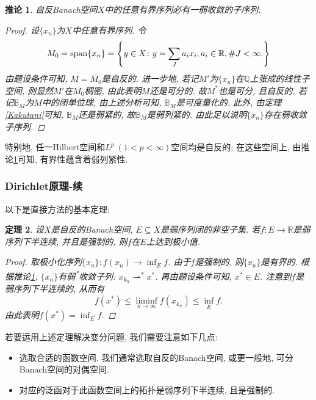 \documentclass[12pt,a4paper]{article}
\newtheorem{theorem}{定理}[section]
\newtheorem{corollary}[theorem]{推论}
\begin{document}
\begin{corollary}\label{coro2.9}
    自反Banach空间$X$中的任意有界序列必有一弱收敛的子序列.
    \begin{proof}
        设$\{x_n\}$为$X$中任意有界序列. 令
        \begin{equation*}
            M_0 = {\rm span} \{x_n\} = \left\{y \in X\colon y = \sum_Ja_ix_i, a_i \in \mathbb{R}, \# J < \infty.\right\}
        \end{equation*}
        由题设条件可知, $M = \overline{M_0}$是自反的. 进一步地, 若记$M'$为$\{x_n\}$在$\mathbb{Q}$上张成的线性子空间, 则显然$M'$在$M_0$稠密, 由此表明$M$还是可分的.
        故$M^*$也是可分, 且自反的. 若记$\mathbb{B}_M$为$M$中的闭单位球, 由上述分析可知, $\mathbb{B}_M$是可度量化的.
        此外, 由定理\ref{Kakutani}可知, $\mathbb{B}_M$还是弱紧的, 故$\mathbb{B}_M$是弱列紧的.
        由此足以说明$\{x_n\}$存在弱收敛子序列.
    \end{proof}
\end{corollary}

特别地, 任一Hilbert空间和$L^p \ (1 < p < \infty)$空间均是自反的; 在这些空间上, 由推论\ref{coro2.9}可知, 有界性蕴含着弱列紧性.

\subsubsection{Dirichlet原理-续}

以下是直接方法的基本定理: 

\begin{theorem}\label{th2.10}
    设$X$是自反的Banach空间, $E \subseteq X$是弱序列闭的非空子集.
    若$f \colon E \rightarrow \mathbb{R}$是弱序列下半连续, 并且是强制的, 则$f$在$E$上达到极小值.
    \begin{proof}
        取极小化序列$\{x_n\}\colon f(x_n) \rightarrow \inf_Ef$. 由于$f$是强制的, 则$\{x_n\}$是有界的.
        根据推论\ref{coro2.9}, $\{x_n\}$有弱\textsuperscript{*}收敛子列: $x_{k_n} \rightharpoonup^* x^*$. 再由题设条件可知, $x^* \in E$.
        注意到$f$是弱序列下半连续的, 从而有 
        \begin{equation*}
            f(x^*) \leq \liminf\limits_{n \rightarrow \infty}f(x_{k_n}) \leq \inf_Ef.
        \end{equation*}
        由此表明$f(x^*) = \inf_Ef$.
    \end{proof}
\end{theorem}

若要运用上述定理解决变分问题, 我们需要注意如下几点:

\begin{itemize}
    \item 选取合适的函数空间. 我们通常选取自反的Banach空间, 或更一般地, 可分Banach空间的对偶空间.
    \item 对应的泛函对于此函数空间上的拓扑是弱序列下半连续, 且是强制的.
\end{itemize}
\end{document}
